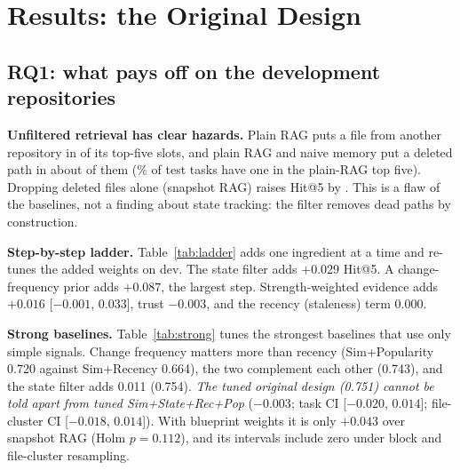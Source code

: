 \documentclass[conference]{IEEEtran}
\begin{document}
\section{Results: the Original Design}
\label{sec:orig}
\subsection{RQ1: what pays off on the development repositories}
\textbf{Unfiltered retrieval has clear hazards.} Plain RAG puts a file from another repository in \contamPlain{} of its top-five slots, and plain RAG and naive memory put a deleted path in about \deadPlain{} of them (\plainDeadTasks{}\% of test tasks have one in the plain-RAG top five). Dropping deleted files alone (snapshot RAG) raises Hit@5 by \dSnapPlainFive{}. This is a flaw of the baselines, not a finding about state tracking: the filter removes dead paths by construction.

\textbf{Step-by-step ladder.} Table~\ref{tab:ladder} adds one ingredient at a time and re-tunes the added weights on dev. The state filter adds $+0.029$ Hit@5. A change-frequency prior adds $+0.087$, the largest step. Strength-weighted evidence adds $+0.016$ [$-0.001$, $0.033$], trust $-0.003$, and the recency (staleness) term $0.000$.

\begin{table}[t]\centering\footnotesize\setlength{\tabcolsep}{4pt}
\resizebox{0.86\textwidth}{!}{}
\caption{Step-by-step ladder for the original design on the development test split. Weights of the added terms are tuned on dev at each step.}
\label{tab:ladder}
\end{table}

\textbf{Strong baselines.} Table~\ref{tab:strong} tunes the strongest baselines that use only simple signals. Change frequency matters more than recency (Sim+Popularity 0.720 against Sim+Recency 0.664), the two complement each other (0.743), and the state filter adds 0.011 (0.754). \emph{The tuned original design (0.751) cannot be told apart from tuned Sim+State+Rec+Pop} ($-0.003$; task CI [$-0.020$, $0.014$]; file-cluster CI [$-0.018$, $0.014$]). With blueprint weights it is only $+0.043$ over snapshot RAG (Holm $p=0.112$), and its intervals include zero under block and file-cluster resampling.

\begin{table}[t]\centering\footnotesize\setlength{\tabcolsep}{4pt}
\resizebox{0.8\textwidth}{!}{}
\caption{Tuned baselines on the development test split. Sim: similarity; State: deleted files removed; Rec: recency; Pop: change frequency. Last columns: Hit@5 of the tuned original design minus the row's system.}
\label{tab:strong}
\end{table}
\end{document}
